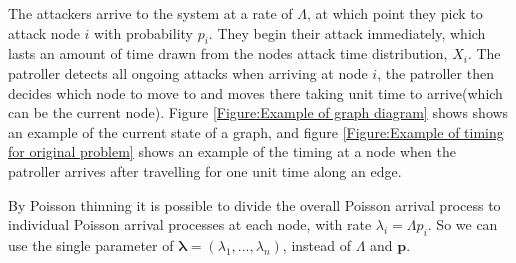 \documentclass[a4paper,10pt]{article}
\theoremstyle{definition}
\theoremstyle{definition}
\theoremstyle{remark}
\theoremstyle{definition}
\begin{document}
The attackers arrive to the system at a rate of $\Lambda$, at which point they pick to attack node $i$ with probability $p_{i}$. They begin their attack immediately, which lasts an amount of time drawn from the nodes attack time distribution, $X_{i}$. The patroller detects all ongoing attacks when arriving at node $i$, the patroller then decides which node to move to and moves there taking unit time to arrive(which can be the current node). Figure \ref{Figure:Example of graph diagram} shows shows an example of the current state of a graph, and figure \ref{Figure:Example of timing for original problem} shows an example of the timing at a node when the patroller arrives after travelling for one unit time along an edge.

By Poisson thinning it is possible to divide the overall Poisson arrival process to individual Poisson arrival processes at each node, with rate $\lambda_{i}=\Lambda p_{i}$. So we can use the single parameter of $\bm{\lambda}=(\lambda_{1},...,\lambda_{n})$, instead of $\Lambda$ and $\bm{p}$.  
\end{document}
